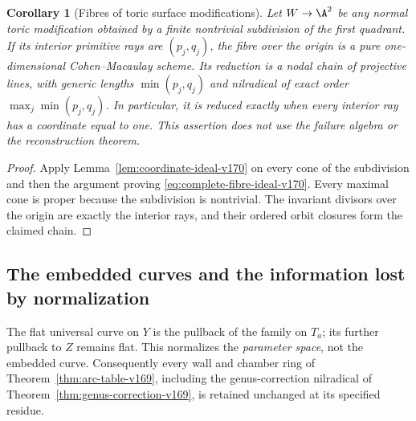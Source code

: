 \documentclass[11pt,reqno]{amsart}
\numberwithin{equation}{section}
\newtheorem{corollary}[theorem]{Corollary}
\theoremstyle{definition}\newtheorem{definition}[theorem]{Definition}
\theoremstyle{remark}\newtheorem{remark}[theorem]{Remark}
\begin{document}
\begin{corollary}[Fibres of toric surface modifications]
\label{cor:toric-fibres-v170}
Let $W\to\A^2$ be any normal toric modification obtained by a finite
nontrivial subdivision of the first quadrant. If its interior
primitive rays are $(p_j,q_j)$, the fibre over the origin is a pure
one-dimensional Cohen--Macaulay scheme. Its reduction is a nodal
chain of projective lines, with generic lengths $\min(p_j,q_j)$
and nilradical of exact order $\max_j\min(p_j,q_j)$. In particular,
it is reduced exactly when every interior ray has a coordinate equal
to one. This assertion does not use the failure algebra or the
reconstruction theorem.
\end{corollary}
\begin{proof}
Apply Lemma~\ref{lem:coordinate-ideal-v170} on every cone of the
subdivision and then the argument proving
\eqref{eq:complete-fibre-ideal-v170}. Every maximal cone is proper
because the subdivision is nontrivial. The invariant divisors over
the origin are exactly the interior rays, and their ordered orbit
closures form the claimed chain.
\end{proof}

\subsection{The embedded curves and the information lost by normalization}
The flat universal curve on $Y$ is the pullback of the family on
$T_a$; its further pullback to $Z$ remains flat. This normalizes the
\emph{parameter space}, not the embedded curve. Consequently every
wall and chamber ring of Theorem~\ref{thm:arc-table-v169}, including
the genus-correction nilradical of
Theorem~\ref{thm:genus-correction-v169}, is retained unchanged at its
specified residue.
\end{document}
